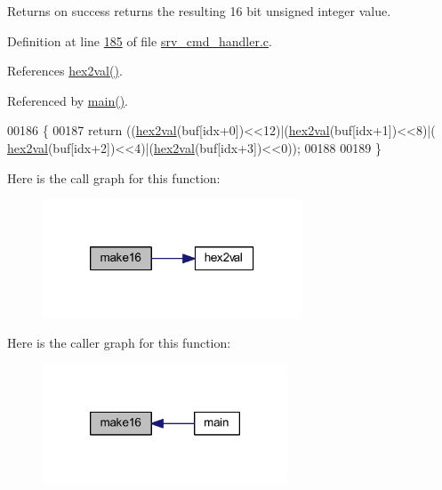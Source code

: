 \begin{DoxyReturn}{Returns}
on success returns the resulting 16 bit unsigned integer value. 

 
\end{DoxyReturn}


Definition at line \hyperlink{a00042_source_l00185}{185} of file \hyperlink{a00042_source}{srv\-\_\-cmd\-\_\-handler.\-c}.



References \hyperlink{a00042_source_l00165}{hex2val()}.



Referenced by \hyperlink{a00035_source_l00198}{main()}.


\begin{DoxyCode}
00186 \{
00187     \textcolor{keywordflow}{return} ((\hyperlink{a00009_gab120dc4bec6b4097a5cd3ebb91131c57}{hex2val}(buf[idx+0])<<12)|(\hyperlink{a00009_gab120dc4bec6b4097a5cd3ebb91131c57}{hex2val}(buf[idx+1])<<8)|(
      \hyperlink{a00009_gab120dc4bec6b4097a5cd3ebb91131c57}{hex2val}(buf[idx+2])<<4)|(\hyperlink{a00009_gab120dc4bec6b4097a5cd3ebb91131c57}{hex2val}(buf[idx+3])<<0));    
00188 
00189 \}
\end{DoxyCode}


Here is the call graph for this function\-:\nopagebreak
\begin{figure}[H]
\begin{center}
\leavevmode
\includegraphics[width=218pt]{da/da0/a00009_ga1e74920f34a07a82cca58eab71ed12b3_cgraph}
\end{center}
\end{figure}




Here is the caller graph for this function\-:\nopagebreak
\begin{figure}[H]
\begin{center}
\leavevmode
\includegraphics[width=206pt]{da/da0/a00009_ga1e74920f34a07a82cca58eab71ed12b3_icgraph}
\end{center}
\end{figure}


